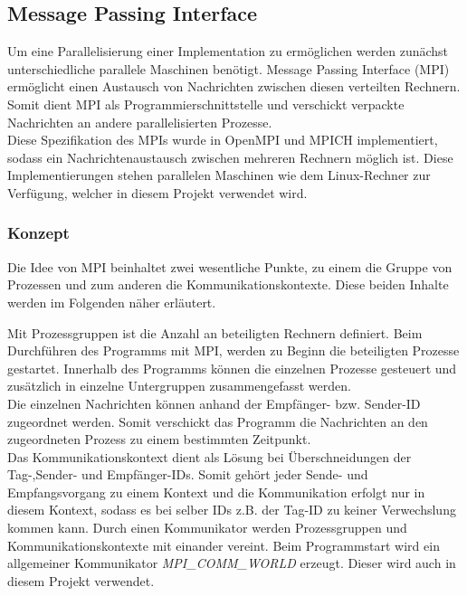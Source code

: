 \subsection{Message Passing Interface}
Um eine Parallelisierung einer Implementation zu ermöglichen werden zunächst unterschiedliche parallele Maschinen benötigt.
Message Passing Interface (MPI) ermöglicht einen Austausch von Nachrichten zwischen diesen verteilten Rechnern. Somit dient MPI als Programmierschnittstelle und verschickt verpackte Nachrichten an andere parallelisierten Prozesse.\\
Diese Spezifikation des MPIs wurde in OpenMPI und MPICH implementiert, sodass ein Nachrichtenaustausch zwischen mehreren Rechnern möglich ist. 
Diese Implementierungen stehen parallelen Maschinen wie dem Linux-Rechner zur Verfügung, welcher in diesem Projekt verwendet wird.\\ 
\subsubsection{Konzept}
Die Idee von MPI beinhaltet zwei wesentliche Punkte, zu einem die Gruppe von Prozessen und zum anderen die Kommunikationskontexte. Diese beiden Inhalte werden im Folgenden näher erläutert.

Mit Prozessgruppen ist die Anzahl an beteiligten Rechnern definiert. Beim Durchführen des Programms mit MPI, werden zu Beginn die beteiligten Prozesse gestartet. Innerhalb des Programms können die einzelnen Prozesse gesteuert und zusätzlich in einzelne Untergruppen zusammengefasst werden. \\
Die einzelnen Nachrichten können anhand der Empfänger- bzw. Sender-ID zugeordnet werden. Somit verschickt das Programm die Nachrichten an den zugeordneten Prozess zu einem bestimmten Zeitpunkt.\\
Das Kommunikationskontext dient als Lösung bei Überschneidungen der Tag-,Sender- und Empfänger-IDs. Somit gehört jeder Sende- und Empfangsvorgang zu einem Kontext und die Kommunikation erfolgt nur in diesem Kontext, sodass es bei selber IDs z.B. der Tag-ID zu keiner Verwechslung kommen kann. 
Durch einen Kommunikator werden Prozessgruppen und Kommunikationskontexte mit einander vereint. Beim Programmstart wird ein allgemeiner Kommunikator \textit{MPI\_COMM\_WORLD} erzeugt. Dieser wird auch in diesem Projekt verwendet.\\
